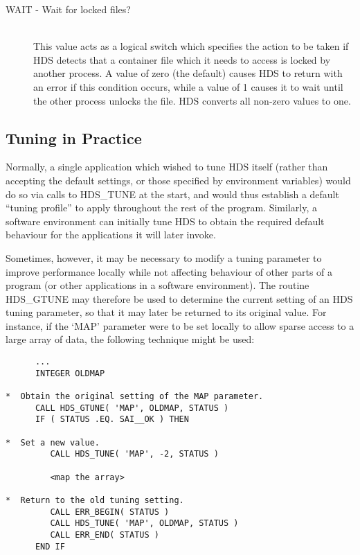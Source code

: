 \begin{description}
\item [WAIT - Wait for locked files?]\mbox{}\\
This value acts as a logical switch which specifies the action to be taken if
HDS detects that a container file which it needs to access is locked by another
process. A value of zero (the default) causes HDS to return with an error if
this condition occurs, while a value of 1 causes it to wait until the other
process unlocks the file. HDS converts all non-zero values to one.

\end{description}

\subsection{Tuning in Practice}
\label{sect:gtune}

Normally, a single application which wished to tune HDS itself (rather than
accepting the default settings, or those specified by environment variables)
would do so via calls to HDS\_TUNE at the start, and would thus establish
a default ``tuning profile'' to apply throughout the rest of the program.
Similarly, a software environment can initially tune HDS to obtain the required
default behaviour for the applications it will later invoke.

Sometimes, however, it may be necessary to modify a tuning parameter to improve
performance locally while not affecting behaviour of other parts of a program
(or other applications in a software environment). The routine HDS\_GTUNE
may therefore be used to determine the current setting of an HDS tuning
parameter, so that it may later be returned to its original value. For
instance, if the `MAP' parameter were to be set locally to allow sparse access
to a large array of data, the following technique might be used:

\small
\begin{verbatim}
      ...
      INTEGER OLDMAP

*  Obtain the original setting of the MAP parameter.
      CALL HDS_GTUNE( 'MAP', OLDMAP, STATUS )
      IF ( STATUS .EQ. SAI__OK ) THEN

*  Set a new value.
         CALL HDS_TUNE( 'MAP', -2, STATUS )

         <map the array>

*  Return to the old tuning setting.
         CALL ERR_BEGIN( STATUS )
         CALL HDS_TUNE( 'MAP', OLDMAP, STATUS )
         CALL ERR_END( STATUS )
      END IF
\end{verbatim}
\normalsize

